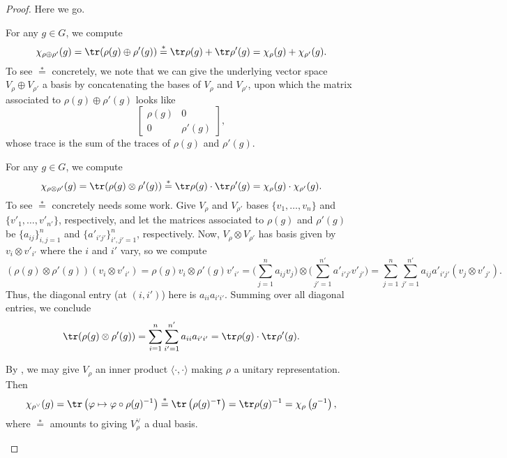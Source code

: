\documentclass[../main.tex]{subfiles}
\begin{document}
\begin{proof}
	Here we go.
	\begin{listalph}
		\item For any $g\in G$, we compute
		\[\chi_{\rho\oplus\rho'}(g)=\tr(\rho(g)\oplus\rho'(g))\stackrel*=\tr\rho(g)+\tr\rho'(g)=\chi_\rho(g)+\chi_{\rho'}(g).\]
		To see $\stackrel*=$ concretely, we note that we can give the underlying vector space $V_\rho\oplus V_{\rho'}$ a basis by concatenating the bases of $V_\rho$ and $V_{\rho'}$, upon which the matrix associated to $\rho(g)\oplus\rho'(g)$ looks like
		\[\begin{bmatrix}
			\rho(g) & 0 \\
			0 & \rho'(g)
		\end{bmatrix},\]
		whose trace is the sum of the traces of $\rho(g)$ and $\rho'(g)$.
		\item For any $g\in G$, we compute
		\[\chi_{\rho\otimes\rho'}(g)=\tr(\rho(g)\otimes\rho'(g))\stackrel*=\tr\rho(g)\cdot\tr\rho'(g)=\chi_\rho(g)\cdot\chi_{\rho'}(g).\]
		To see $\stackrel*=$ concretely needs some work. Give $V_\rho$ and $V_{\rho'}$ bases $\{v_1,\ldots,v_n\}$ and $\{v'_1,\ldots,v'_{n'}\}$, respectively, and let the matrices associated to $\rho(g)$ and $\rho'(g)$ be $\{a_{ij}\}_{i,j=1}^n$ and $\{a'_{i'j'}\}_{i',j'=1}^n$, respectively. Now, $V_\rho\otimes V_{\rho'}$ has basis given by $v_i\otimes v'_{i'}$ where the $i$ and $i'$ vary, so we compute
		\[(\rho(g)\otimes\rho'(g))(v_i\otimes v'_{i'})=\rho(g)v_i\otimes\rho'(g)v'_{i'}=\Bigg(\sum_{j=1}^na_{ij}v_j\Bigg)\otimes\Bigg(\sum_{j'=1}^{n'}a'_{i'j'}v'_{j'}\Bigg)=\sum_{j=1}^n\sum_{j'=1}^{n'}a_{ij}a'_{i'j'}(v_j\otimes v'_{j'}).\]
		Thus, the diagonal entry (at $(i,i')$) here is $a_{ii}a_{i'i'}$. Summing over all diagonal entries, we conclude
		\[\tr(\rho(g)\otimes\rho'(g))=\sum_{i=1}^n\sum_{i'=1}^{n'}a_{ii}a_{i'i'}=\tr\rho(g)\cdot\tr\rho'(g).\]
		\item By , we may give $V_\rho$ an inner product $\langle\cdot,\cdot\rangle$ making $\rho$ a unitary representation. Then
		\[\chi_{\rho^\lor}(g)=\tr\left(\varphi\mapsto\varphi\circ\rho(g)^{-1}\right)\stackrel*=\tr\left(\rho(g)^{-\intercal}\right)=\tr\rho(g)^{-1}=\chi_\rho\left(g^{-1}\right),\]
		where $\stackrel*=$ amounts to giving $V_\rho^\lor$ a dual basis.
		\qedhere
	\end{listalph}
\end{proof}
\end{document}
